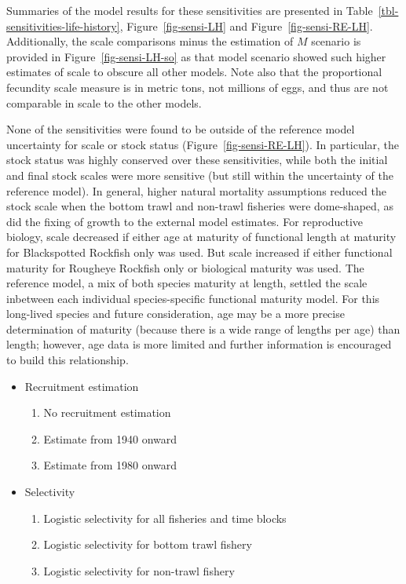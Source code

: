 \documentclass[
]{scrartcl}
\providecommand{\tightlist}{%
  \setlength{\itemsep}{0pt}\setlength{\parskip}{0pt}}\usepackage{longtable,booktabs,array}
\begin{document}
Summaries of the model results for these sensitivities are presented in
Table~\ref{tbl-sensitivities-life-history}, Figure~\ref{fig-sensi-LH}
and Figure~\ref{fig-sensi-RE-LH}. Additionally, the scale comparisons
minus the estimation of \(M\) scenario is provided in
Figure~\ref{fig-sensi-LH-so} as that model scenario showed such higher
estimates of scale to obscure all other models. Note also that the
proportional fecundity scale measure is in metric tons, not millions of
eggs, and thus are not comparable in scale to the other models.

None of the sensitivities were found to be outside of the reference
model uncertainty for scale or stock status
(Figure~\ref{fig-sensi-RE-LH}). In particular, the stock status was
highly conserved over these sensitivities, while both the initial and
final stock scales were more sensitive (but still within the uncertainty
of the reference model). In general, higher natural mortality
assumptions reduced the stock scale when the bottom trawl and non-trawl
fisheries were dome-shaped, as did the fixing of growth to the external
model estimates. For reproductive biology, scale decreased if either age
at maturity of functional length at maturity for Blackspotted Rockfish
only was used. But scale increased if either functional maturity for
Rougheye Rockfish only or biological maturity was used. The reference
model, a mix of both species maturity at length, settled the scale
inbetween each individual species-specific functional maturity model.
For this long-lived species and future consideration, age may be a more
precise determination of maturity (because there is a wide range of
lengths per age) than length; however, age data is more limited and
further information is encouraged to build this relationship.

\begin{itemize}
\item
  Recruitment estimation

  \begin{enumerate}
  \def\labelenumi{\arabic{enumi}.}
  \setcounter{enumi}{12}
  \tightlist
  \item
    No recruitment estimation
  \item
    Estimate from 1940 onward
  \item
    Estimate from 1980 onward
  \end{enumerate}
\item
  Selectivity

  \begin{enumerate}
  \def\labelenumi{\arabic{enumi}.}
  \setcounter{enumi}{15}
  \tightlist
  \item
    Logistic selectivity for all fisheries and time blocks
  \item
    Logistic selectivity for bottom trawl fishery
  \item
    Logistic selectivity for non-trawl fishery
  \end{enumerate}
\end{itemize}
\end{document}

